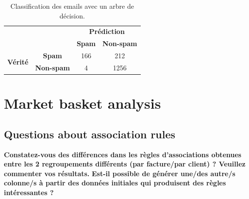 \documentclass[a4paper]{article}
\begin{document}
\begin{table}[H]
	\centering
	\begin{tabular}{cccl}
	\def\arraystretch{2.0}
	& \textbf{}
	& \multicolumn{2}{c}{\textbf{Prédiction}}\\ \cline{3-4} 
	& \multicolumn{1}{c|}{}
	& \multicolumn{1}{c|}{\textbf{Spam}}
	& \multicolumn{1}{c|}{\textbf{Non-spam}} \\ \cline{2-4} 
	\multicolumn{1}{c|}{\multirow{2}{*}{\textbf{Vérité}}}
	& \multicolumn{1}{c|}{\textbf{Spam}}
	& \multicolumn{1}{c|}{166}
	& \multicolumn{1}{c|}{212}\\ \cline{2-4} 
	\multicolumn{1}{c|}{}
	& \multicolumn{1}{c|}{\textbf{Non-spam}} & \multicolumn{1}{c|}{4}
	& \multicolumn{1}{c|}{1256}\\ \cline{2-4} 
	\end{tabular}
	\caption{Classification des emails avec un arbre de décision.}
\end{table}


\pagebreak
\section{Market basket analysis}
\subsection{Questions about association rules}
\textbf{Constatez-vous des différences dans les règles d'associations obtenues entre les 2 regroupements différents (par facture/par client) ? Veuillez commenter vos résultats.}
\textbf{Est-il possible de générer une/des autre/s colonne/s à partir des données initiales qui produisent des règles intéressantes ?}
\end{document}
